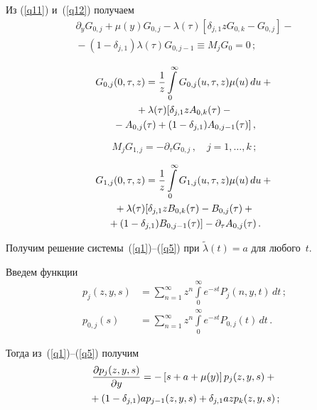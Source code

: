 \begin{multicols}{2}
Из (\ref{q11}) и~(\ref{q12}) получаем
\begin{multline*}
\partial_{y}G_{0,j}+\mu(y)G_{0,j}-\lambda(\tau)[\delta_{j,1}zG_{0,k}-G_{0,j}]-{}\\
{}-(1-\delta_{j,1})\lambda(\tau)G_{0,j-1}\equiv M_{j}G_{0}=0\,;
\end{multline*}
\vspace*{-16pt}

\noindent
\begin{multline*}
G_{0,j}(0,\tau,z)=\displaystyle\frac{\displaystyle 1\mathstrut}{\displaystyle z\mathstrut}\int\limits_{0}^{\infty}G_{0,j}(u,\tau,z)\mu(u)\,du+{}\\
{}+ \lambda(\tau)[\delta_{j,1}zA_{0,k}(\tau)-{}\\
{} -A_{0,j}(\tau)+(1-\delta_{j,1})A_{0,j-1}(\tau)]\,,
\end{multline*}
\vspace*{-12pt}

\noindent
\begin{equation*}
M_{j}G_{1,j}=-\partial_{\tau}G_{0,j}\,,\quad j=1,\ldots , k\,;
\end{equation*}

\vspace*{-12pt}

\noindent
\begin{multline}
G_{1,j}(0,\tau,z)=\displaystyle\frac{\displaystyle 1\mathstrut}{\displaystyle z\mathstrut}\int\limits_{0}^{\infty}G_{1,j}(u,\tau,z)\mu(u)\,du+{}\\
{}+
\lambda(\tau)[\delta_{j,1}zB_{0,k}(\tau)- B_{0,j}(\tau)+{}\\
{}+(1-\delta_{j,1})B_{0,j-1}(\tau)]-\partial_{\tau}A_{0,j}(\tau)\,.
\label{q16}
\end{multline}

 Получим решение системы~(\ref{q1})--(\ref{q5}) при $\widetilde{\lambda}(t)=a$ для любого~$t$.

 Введем функции
\begin{align*}
p_{j}(z,y,s)&=\sum_{n=1}^{\infty}z^{n}\int\limits_{0}^{\infty}e^{-st}P_{j}(n,y,t)\,dt\,;\\
p_{0,j}(s)&=\sum_{n=1}^{\infty}z^{n}\int\limits_{0}^{\infty}e^{-st}P_{0,j}(t)\,dt\,.
\end{align*}

Тогда из~(\ref{q1})--(\ref{q5}) получим
\begin{multline}
\displaystyle\frac{\displaystyle \partial p_{j}(z,y,s)\mathstrut}{\displaystyle \partial y\mathstrut}
=-\left[s+a+\mu(y)\right]p_{j}(z,y,s) +{}\\
{}+(1-\delta_{j,1})ap_{j-1}(z,y,s) +
\delta_{j,1}azp_{k}(z,y,s)\,;
\label{q18}
\end{multline}


\end{multicols}
